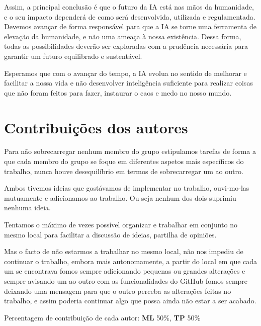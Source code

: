 \documentclass{report}
\begin{document}
Assim, a principal conclusão é que o futuro da \ac{IA} está nas mãos da humanidade, e o seu impacto dependerá de como será desenvolvida, utilizada e regulamentada. Devemos avançar de forma responsável para que a \ac{IA} se torne uma ferramenta de elevação da humanidade, e não uma ameaça à nossa existência. Dessa forma, todas as possibilidades deverão ser exploradas com a prudência necessária para garantir um futuro equilibrado e sustentável.
\vspace{5pt}

Esperamos que com o avançar do tempo, a \ac{IA} evolua no sentido de melhorar e facilitar a nossa vida e não desenvolver inteligência suficiente para realizar coisas que não foram feitos para fazer, instaurar o caos e medo no nosso mundo. 

\chapter*{Contribuições dos autores}
Para não sobrecarregar nenhum membro do grupo estipulamos tarefas de forma a que cada membro do grupo se foque em diferentes aspetos mais específicos do trabalho, nunca houve desequilíbrio em termos de sobrecarregar um ao outro. 

Ambos tivemos ideias que gostávamos de implementar no trabalho, ouvi-mo-las mutuamente e adicionamos ao trabalho. Ou seja nenhum dos dois suprimiu nenhuma ideia. 

\vspace{5pt}

Tentamos o máximo de vezes possível organizar e trabalhar em conjunto no mesmo local para facilitar a discussão de ideias, partilha de opiniões. 

\vspace{5pt}


Mas o facto de não estarmos a trabalhar no mesmo local, não nos impediu de continuar o trabalho, embora mais autonomamente, a partir do local em que cada um se encontrava fomos sempre adicionando pequenas ou grandes alterações e sempre avisando um ao outro com as funcionalidades do GitHub 
fomos sempre deixando uma mensagem para que o outro perceba as alterações feitas no trabalho, 
e assim poderia continuar algo que possa ainda não estar a ser acabado.



\vspace{10pt}
Percentagem de contribuição de cada autor: \textbf{\ac{ML}} 50\%, \textbf{\ac{TP}} 50\%\
\end{document}
